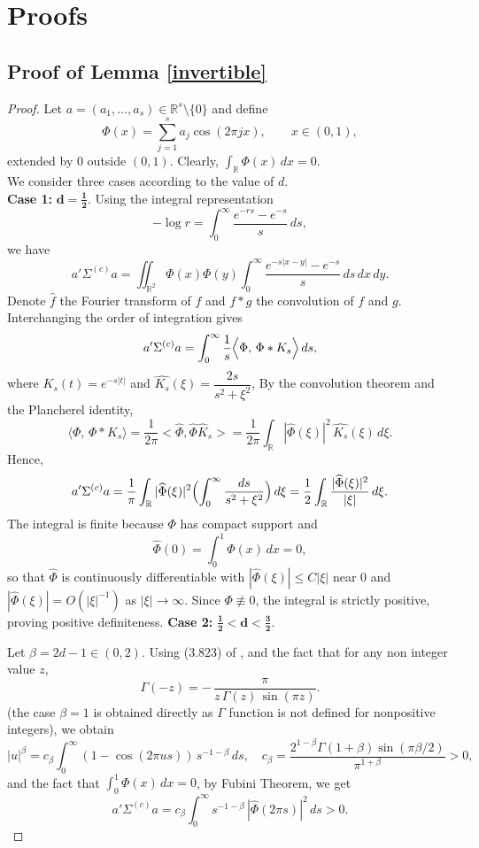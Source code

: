 \documentclass[12pt]{article}
\numberwithin{equation}{section}
\begin{document}
\section{Proofs}\label{proofs}
\subsection{ Proof of Lemma \ref{invertible}}
\begin{proof}
\medskip
\noindent
Let $a=(a_1,\ldots,a_s)\in\mathbb{R}^s\setminus\{0\}$ and define
\[
\Phi(x) = \sum_{j=1}^{s} a_j \cos(2\pi jx), \qquad x\in(0,1),
\]
extended by $0$ outside $(0,1)$. Clearly, $\displaystyle \int_{\mathbb{R}}\Phi(x)\,dx=0$. \\We consider three cases according to the value of $d$.
\\  
\textbf{Case 1:} $\mathbf{d=\tfrac{1}{2}}$.
Using the integral representation
\[
-\log r = \int_0^\infty \frac{e^{-rs}-e^{-s}}{s}\,ds,
\]
we have
\[
a'\Sigma^{(c)}a = \iint_{\mathbb{R}^2} \Phi(x)\Phi(y)
\!\int_0^\infty \frac{e^{-s|x-y|}-e^{-s}}{s}\,ds\,dx\,dy.
\]
Denote $\hat f$  the Fourier transform of $f$ and $f*g$ the convolution of $f$ and $g$.
Interchanging the order of integration gives
\[
a'\Sigma^{(c)}a = \int_0^\infty \frac{1}{s}
\Bigl\langle \Phi,\, \Phi*K_s \Bigr\rangle\,ds,
\]
where $K_s(t)=e^{-s|t|}$ and $\widehat{K_s}(\xi)=\dfrac{2s}{s^2+\xi^2}$,  
By the convolution theorem and the Plancherel identity,
\[
\langle \Phi,\,\Phi*K_s\rangle
= \frac{1}{2\pi}<\widehat\Phi,\widehat\Phi\widehat K_s>=\frac{1}{2\pi}\int_{\mathbb{R}} |\widehat{\Phi}(\xi)|^2 \,\widehat{K_s}(\xi)\,d\xi.
\]
Hence,
\[
a'\Sigma^{(c)}a
= \frac{1}{\pi}\int_{\mathbb{R}} |\widehat{\Phi}(\xi)|^2
\Bigl(\int_0^\infty \frac{ds}{s^2+\xi^2}\Bigr)\,d\xi
= \frac{1}{2}\int_{\mathbb{R}}\frac{|\widehat{\Phi}(\xi)|^2}{|\xi|}\,d\xi.
\]
The integral is finite because $\Phi$ has compact support and
\[
\widehat{\Phi}(0)=\int_0^1\Phi(x)\,dx=0,
\]
so that $\widehat{\Phi}$ is continuously differentiable with
$|\widehat{\Phi}(\xi)|\le C|\xi|$ near $0$ and $|\widehat{\Phi}(\xi)|=O(|\xi|^{-1})$ as $|\xi|\to\infty$.  
Since $\Phi\not\equiv0$, the integral is strictly positive, proving positive definiteness.  
\medskip
\noindent
\textbf{Case 2:} $\mathbf{\tfrac{1}{2}< d<\tfrac{3}{2}}$.

Let $\beta=2d-1\in(0,2)$.  Using (3.823) of  \cite{gradshteyn2007tables}, and the fact that for any non integer value $z$,
\[
\Gamma(-z) = -\,\frac{\pi}{z\,\Gamma(z)\,\sin(\pi z)}.
\]
(the case $\beta=1$ is obtained directly as $\Gamma$  function is not defined for nonpositive integers), we obtain
\[
|u|^{\beta}
= c_\beta \int_0^\infty (1-\cos(2\pi us))\,s^{-1-\beta}\,ds,
\quad
c_\beta=\frac{2^{1-\beta}\Gamma(1+\beta)\sin(\pi\beta/2)}{\pi^{1+\beta}}>0,
\]
and the fact that $\int_0^1\Phi(x)\,dx=0$, by Fubini Theorem, we get
\[
a'\Sigma^{(c)}a
= c_\beta \int_0^\infty s^{-1-\beta}\,|\widehat{\Phi}(2\pi s)|^2\,ds > 0.
\]


\end{proof}
\end{document}
